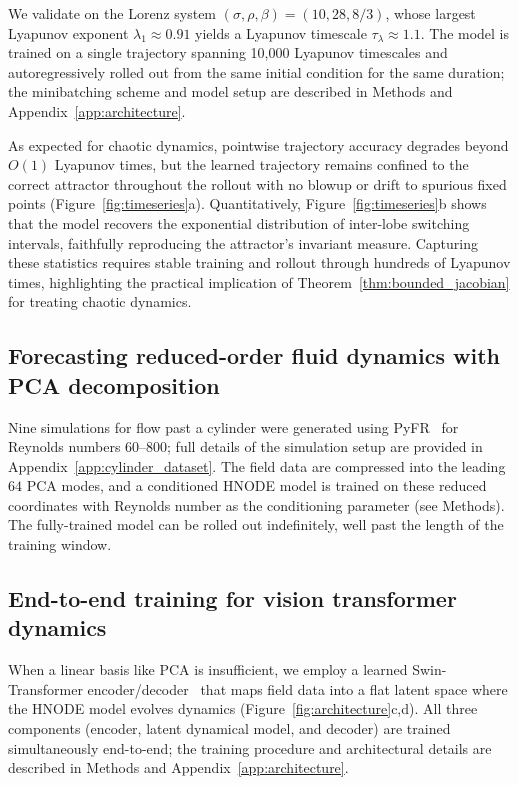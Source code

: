 \documentclass[12pt]{article}
\begin{document}
We validate on the Lorenz system $(\sigma, \rho, \beta) = (10, 28, 8/3)$, whose largest Lyapunov exponent $\lambda_1 \approx 0.91$ yields a Lyapunov timescale $\tau_\lambda \approx 1.1$. The model is trained on a single trajectory spanning 10,000 Lyapunov timescales and autoregressively rolled out from the same initial condition for the same duration; the minibatching scheme and model setup are described in Methods and Appendix~\ref{app:architecture}.

As expected for chaotic dynamics, pointwise trajectory accuracy degrades beyond $O(1)$ Lyapunov times, but the learned trajectory remains confined to the correct attractor throughout the rollout with no blowup or drift to spurious fixed points (Figure~\ref{fig:timeseries}a). Quantitatively, Figure~\ref{fig:timeseries}b shows that the model recovers the exponential distribution of inter-lobe switching intervals, faithfully reproducing the attractor's invariant measure. Capturing these statistics requires stable training and rollout through hundreds of Lyapunov times, highlighting the practical implication of Theorem~\ref{thm:bounded_jacobian} for treating chaotic dynamics.

\subsection{Forecasting reduced-order fluid dynamics with PCA decomposition}

Nine simulations for flow past a cylinder were generated using PyFR~\cite{witherden2014pyfr} for Reynolds numbers $60$--$800$; full details of the simulation setup are provided in Appendix~\ref{app:cylinder_dataset}. The field data are compressed into the leading $64$ PCA modes, and a conditioned HNODE model is trained on these reduced coordinates with Reynolds number as the conditioning parameter (see Methods). The fully-trained model can be rolled out indefinitely, well past the length of the training window.

\subsection{End-to-end training for vision transformer dynamics}

When a linear basis like PCA is insufficient, we employ a learned Swin-Transformer encoder/decoder~\citep{Liu_2021_ICCV, 10.1007/978-3-031-25066-8_9} that maps field data into a flat latent space where the HNODE model evolves dynamics (Figure~\ref{fig:architecture}c,d). All three components (encoder, latent dynamical model, and decoder) are trained simultaneously end-to-end; the training procedure and architectural details are described in Methods and Appendix~\ref{app:architecture}.
\end{document}
